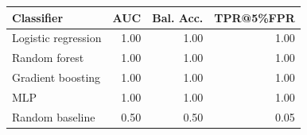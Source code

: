 \begin{tabular}{lrrr}
\toprule
\textbf{Classifier} & \textbf{AUC} & \textbf{Bal. Acc.} & \textbf{TPR@5\%FPR} \\
\midrule
Logistic regression & 1.00 & 1.00 & 1.00 \\
Random forest & 1.00 & 1.00 & 1.00 \\
Gradient boosting & 1.00 & 1.00 & 1.00 \\
MLP & 1.00 & 1.00 & 1.00 \\
Random baseline & 0.50 & 0.50 & 0.05 \\
\bottomrule
\end{tabular}
